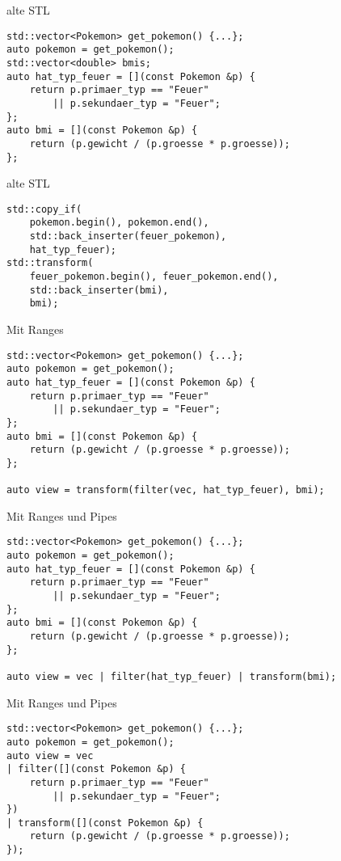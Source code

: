 \begin{frame}[fragile]{alte STL}
    \begin{verbatim}
std::vector<Pokemon> get_pokemon() {...};
auto pokemon = get_pokemon();
std::vector<double> bmis;
auto hat_typ_feuer = [](const Pokemon &p) {
    return p.primaer_typ == "Feuer"
        || p.sekundaer_typ = "Feuer";
};
auto bmi = [](const Pokemon &p) {
    return (p.gewicht / (p.groesse * p.groesse));
};

    \end{verbatim}
\end{frame}

\begin{frame}[fragile]{alte STL}
    \begin{verbatim}
std::copy_if(
    pokemon.begin(), pokemon.end(),
    std::back_inserter(feuer_pokemon),
    hat_typ_feuer);
std::transform(
    feuer_pokemon.begin(), feuer_pokemon.end(),
    std::back_inserter(bmi),
    bmi);
    \end{verbatim}
\end{frame}

\begin{frame}[fragile]{Mit Ranges}
    \begin{verbatim}
std::vector<Pokemon> get_pokemon() {...};
auto pokemon = get_pokemon();
auto hat_typ_feuer = [](const Pokemon &p) {
    return p.primaer_typ == "Feuer"
        || p.sekundaer_typ = "Feuer";
};
auto bmi = [](const Pokemon &p) {
    return (p.gewicht / (p.groesse * p.groesse));
};

auto view = transform(filter(vec, hat_typ_feuer), bmi);

\end{verbatim}
\end{frame}

\begin{frame}[fragile]{Mit Ranges und Pipes}
    \begin{verbatim}
std::vector<Pokemon> get_pokemon() {...};
auto pokemon = get_pokemon();
auto hat_typ_feuer = [](const Pokemon &p) {
    return p.primaer_typ == "Feuer"
        || p.sekundaer_typ = "Feuer";
};
auto bmi = [](const Pokemon &p) {
    return (p.gewicht / (p.groesse * p.groesse));
};

auto view = vec | filter(hat_typ_feuer) | transform(bmi);

    \end{verbatim}
\end{frame}

\begin{frame}[fragile]{Mit Ranges und Pipes}
    \begin{verbatim}
std::vector<Pokemon> get_pokemon() {...};
auto pokemon = get_pokemon();
auto view = vec
| filter([](const Pokemon &p) {
    return p.primaer_typ == "Feuer"
        || p.sekundaer_typ = "Feuer";
})
| transform([](const Pokemon &p) {
    return (p.gewicht / (p.groesse * p.groesse));
});
    \end{verbatim}
\end{frame}

